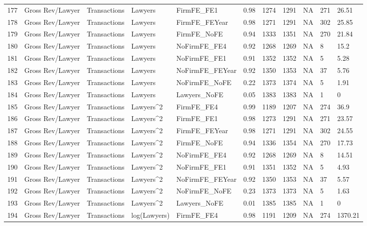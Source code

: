 \documentclass{article}
\begin{document}
\begin{table}[H]
\begin{tabular}{rllllllllll}
  177 & Gross Rev/Lawyer & Transactions & Lawyers & FirmFE\_FE1 & 0.98 & 1274 & 1291 & NA & 271 & 26.51 \\ 
  178 & Gross Rev/Lawyer & Transactions & Lawyers & FirmFE\_FEYear & 0.98 & 1271 & 1291 & NA & 302 & 25.85 \\ 
  179 & Gross Rev/Lawyer & Transactions & Lawyers & FirmFE\_NoFE & 0.94 & 1333 & 1351 & NA & 270 & 21.84 \\ 
  180 & Gross Rev/Lawyer & Transactions & Lawyers & NoFirmFE\_FE4 & 0.92 & 1268 & 1269 & NA & 8 & 15.2 \\ 
  181 & Gross Rev/Lawyer & Transactions & Lawyers & NoFirmFE\_FE1 & 0.91 & 1352 & 1352 & NA & 5 & 5.28 \\ 
  182 & Gross Rev/Lawyer & Transactions & Lawyers & NoFirmFE\_FEYear & 0.92 & 1350 & 1353 & NA & 37 & 5.76 \\ 
  183 & Gross Rev/Lawyer & Transactions & Lawyers & NoFirmFE\_NoFE & 0.22 & 1373 & 1374 & NA & 5 & 1.91 \\ 
  184 & Gross Rev/Lawyer & Transactions & Lawyers & Lawyers\_NoFE & 0.05 & 1383 & 1383 & NA & 1 & 0 \\ 
  185 & Gross Rev/Lawyer & Transactions & Lawyers^2 & FirmFE\_FE4 & 0.99 & 1189 & 1207 & NA & 274 & 36.9 \\ 
  186 & Gross Rev/Lawyer & Transactions & Lawyers^2 & FirmFE\_FE1 & 0.98 & 1273 & 1291 & NA & 271 & 23.57 \\ 
  187 & Gross Rev/Lawyer & Transactions & Lawyers^2 & FirmFE\_FEYear & 0.98 & 1271 & 1291 & NA & 302 & 24.55 \\ 
  188 & Gross Rev/Lawyer & Transactions & Lawyers^2 & FirmFE\_NoFE & 0.94 & 1336 & 1354 & NA & 270 & 17.73 \\ 
  189 & Gross Rev/Lawyer & Transactions & Lawyers^2 & NoFirmFE\_FE4 & 0.92 & 1268 & 1269 & NA & 8 & 14.51 \\ 
  190 & Gross Rev/Lawyer & Transactions & Lawyers^2 & NoFirmFE\_FE1 & 0.91 & 1351 & 1352 & NA & 5 & 4.93 \\ 
  191 & Gross Rev/Lawyer & Transactions & Lawyers^2 & NoFirmFE\_FEYear & 0.92 & 1350 & 1353 & NA & 37 & 5.57 \\ 
  192 & Gross Rev/Lawyer & Transactions & Lawyers^2 & NoFirmFE\_NoFE & 0.23 & 1373 & 1373 & NA & 5 & 1.63 \\ 
  193 & Gross Rev/Lawyer & Transactions & Lawyers^2 & Lawyers\_NoFE & 0.01 & 1385 & 1385 & NA & 1 & 0 \\ 
  194 & Gross Rev/Lawyer & Transactions & log(Lawyers) & FirmFE\_FE4 & 0.98 & 1191 & 1209 & NA & 274 & 1370.21 \\ 

\end{tabular}
\end{table}
\end{document}
